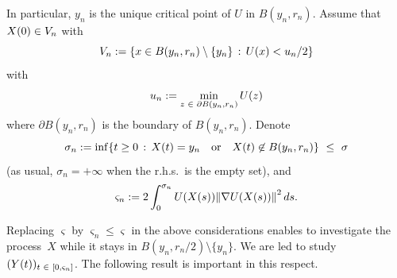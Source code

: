 \documentclass[AHL,Unicode,longabstracts,published]{cedram}
\newcommand{\iy}{\infty}
\newcommand{\na}{\nabla}
\newcommand{\pa}{\partial}
\let\originalleft\left
\let\originalright\right
\renewcommand{\left}{\mathopen{}\mathclose\bgroup\originalleft}
\renewcommand{\right}{\aftergroup\egroup\originalright}
\let\oldin\in
\renewcommand{\in}{\mathchoice{\oldin}{\oldin}{\,\oldin\,}{\,\oldin\,}}
\begin{document}
In particular, $y_n$ is the unique critical point of $U$ in $B(y_n,r_n)$. Assume that $X(0)\in V_n$ with
\begin{equation}\label{Vn}
V_n := \left\{x\in B(y_n,r_n)\setminus\{y_n\}\,:\, U(x)<u_n/2\right\}
\end{equation}
with
\begin{equation}\label{cnn}
u_n := \min_{z\in \pa B(y_n,r_n)}U(z)
\end{equation}
where $\pa B(y_n,r_n)$ is the boundary of $B(y_n,r_n)$. Denote
\begin{equation}\label{sn}
\sigma_n := \inf\{t\geq 0\,:\, X(t)=y_n\quad\text{or}\quad X(t)\not\in B(y_n,r_n)\}\ \leq \ \sigma
\end{equation}
(as usual, $\sigma_n=+\iy$ when the r.h.s.\ is the empty set), and
\begin{equation*}
\varsigma_n := 2\int_0^{\sigma_n} U(X(s))\left\| \na U(X(s))\right\|^2\, ds.
\end{equation*}


Replacing $\varsigma$ by $\varsigma_n\leq \varsigma$ in the above considerations enables to investigate the process~$X$ while it stays in $B(y_n,r_n/2)\setminus\{y_n\}$. We are led to study $(Y(t))_{t\in[0,\varsigma_n]}$. The following result is important in this respect.
\end{document}
